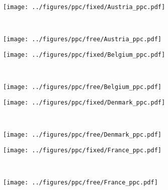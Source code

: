 \documentclass[12pt]{extarticle}
\begin{document}
\begin{figure}[h]	
    \centering
    \begin{subfigure}{0.45\textwidth}
        \texttt{[image: ../figures/ppc/fixed/Austria\_ppc.pdf]}
    \end{subfigure}
    \label{fig:ppc}
    ~
    \begin{subfigure}{0.45\textwidth}
        \texttt{[image: ../figures/ppc/free/Austria\_ppc.pdf]}
    \end{subfigure}
    \begin{subfigure}{0.45\textwidth}
        \texttt{[image: ../figures/ppc/fixed/Belgium\_ppc.pdf]}
    \end{subfigure}
    ~
    \begin{subfigure}{0.45\textwidth}
        \texttt{[image: ../figures/ppc/free/Belgium\_ppc.pdf]}
    \end{subfigure}
     \begin{subfigure}{0.45\textwidth}
        \texttt{[image: ../figures/ppc/fixed/Denmark\_ppc.pdf]}
    \end{subfigure}
    ~
    \begin{subfigure}{0.45\textwidth}
        \texttt{[image: ../figures/ppc/free/Denmark\_ppc.pdf]}
    \end{subfigure}
    \begin{subfigure}{0.45\textwidth}
        \texttt{[image: ../figures/ppc/fixed/France\_ppc.pdf]}
    \end{subfigure}
    ~
    \begin{subfigure}{0.45\textwidth}
        \texttt{[image: ../figures/ppc/free/France\_ppc.pdf]}
    \end{subfigure}
\end{figure}
\end{document}
